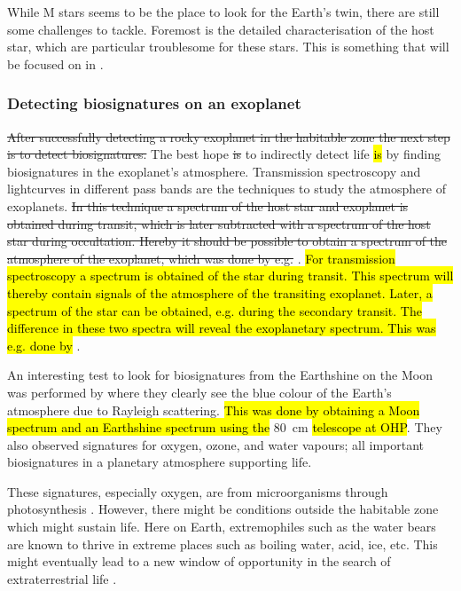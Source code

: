 While M stars seems to be the place to look for the Earth's twin, there are still some challenges to
tackle. Foremost is the detailed characterisation of the host star, which are particular troublesome
for these stars. This is something that will be focused on in .

\subsubsection{Detecting biosignatures on an exoplanet}

\st{After successfully detecting a rocky exoplanet in the habitable zone the next step is to detect
biosignatures.} The best hope \st{is} to indirectly detect life \hl{is} by finding biosignatures
\citep[see e.g.]{Snellen2013,Kasting2002} in the exoplanet's atmosphere. Transmission spectroscopy
and lightcurves in different pass bands are the techniques to study the atmosphere of exoplanets.
\st{In this technique a spectrum of the host star and exoplanet is obtained during transit, which is
later subtracted with a spectrum of the host star during occultation. Hereby it should be possible to
obtain a spectrum of the atmosphere of the exoplanet, which was done by e.g.}
\citet{Charbonneau2002}. \hl{For transmission spectroscopy a spectrum is obtained of the star during
transit. This spectrum will thereby contain signals of the atmosphere of the transiting exoplanet.
Later, a spectrum of the star can be obtained, e.g. during the secondary transit. The difference in
these two spectra will reveal the exoplanetary spectrum. This was e.g. done by}
\citet{Charbonneau2002}.

An interesting test to look for biosignatures from the Earthshine on the Moon was performed by
\citet{Arnold2002} where they clearly see the blue colour of the Earth's atmosphere due to Rayleigh
scattering. \hl{This was done by obtaining a Moon spectrum and an Earthshine spectrum using the}
\SI{80}{cm} \hl{telescope at OHP}. They also observed signatures for oxygen, ozone, and water
vapours; all important biosignatures in a planetary atmosphere supporting life.

These signatures, especially oxygen, are from microorganisms through photosynthesis
\citep[see e.g.][]{Kasting2002}. However, there might be conditions outside the habitable zone which
might sustain life. Here on Earth, extremophiles such as the water bears are known to thrive in
extreme places such as boiling water, acid, ice, etc. This might eventually lead to a new window of
opportunity in the search of extraterrestrial life \citep{Cavicchioli2002}.



